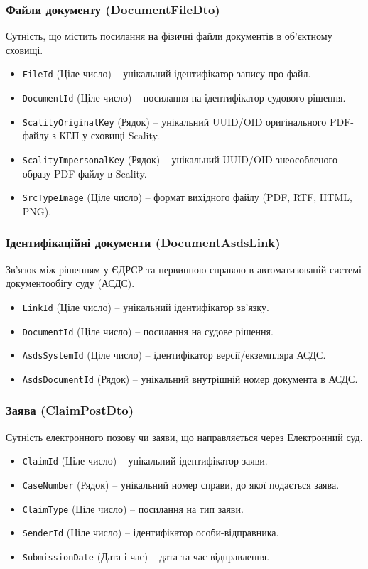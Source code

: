 \documentclass{article}
\begin{document}
\subsubsection{Файли документу (DocumentFileDto)}
Сутність, що містить посилання на фізичні файли документів в об'єктному сховищі.
\begin{itemize}
    \item \texttt{FileId} (Ціле число) -- унікальний ідентифікатор запису про файл.
    \item \texttt{DocumentId} (Ціле число) -- посилання на ідентифікатор судового рішення.
    \item \texttt{ScalityOriginalKey} (Рядок) -- унікальний UUID/OID оригінального PDF-файлу з КЕП у сховищі Scality.
    \item \texttt{ScalityImpersonalKey} (Рядок) -- унікальний UUID/OID знеособленого образу PDF-файлу в Scality.
    \item \texttt{SrcTypeImage} (Ціле число) -- формат вихідного файлу (PDF, RTF, HTML, PNG).
\end{itemize}

\subsubsection{Ідентифікаційні документи (DocumentAsdsLink)}
Зв'язок між рішенням у ЄДРСР та первинною справою в автоматизованій системі документообігу суду (АСДС).
\begin{itemize}
    \item \texttt{LinkId} (Ціле число) -- унікальний ідентифікатор зв'язку.
    \item \texttt{DocumentId} (Ціле число) -- посилання на судове рішення.
    \item \texttt{AsdsSystemId} (Ціле число) -- ідентифікатор версії/екземпляра АСДС.
    \item \texttt{AsdsDocumentId} (Рядок) -- унікальний внутрішній номер документа в АСДС.
\end{itemize}

\subsubsection{Заява (ClaimPostDto)}
Сутність електронного позову чи заяви, що направляється через Електронний суд.
\begin{itemize}
    \item \texttt{ClaimId} (Ціле число) -- унікальний ідентифікатор заяви.
    \item \texttt{CaseNumber} (Рядок) -- унікальний номер справи, до якої подається заява.
    \item \texttt{ClaimType} (Ціле число) -- посилання на тип заяви.
    \item \texttt{SenderId} (Ціле число) -- ідентифікатор особи-відправника.
    \item \texttt{SubmissionDate} (Дата і час) -- дата та час відправлення.
\end{itemize}
\end{document}
